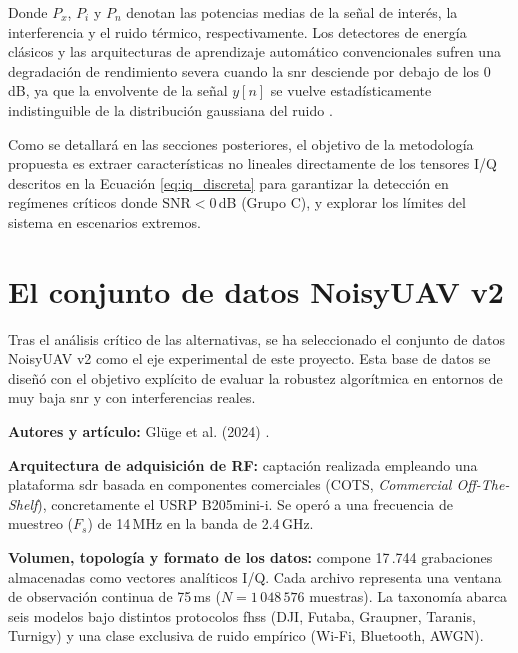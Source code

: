 Donde $P_x$, $P_i$ y $P_n$ denotan las potencias medias de la señal de interés, la interferencia y el ruido térmico, respectivamente. Los detectores de energía clásicos y las arquitecturas de aprendizaje automático convencionales sufren una degradación de rendimiento severa cuando la \gls{snr} desciende por debajo de los 0\,dB, ya que la envolvente de la señal $y[n]$ se vuelve estadísticamente indistinguible de la distribución gaussiana del ruido \cite{lacy_machine_2024}.

Como se detallará en las secciones posteriores, el objetivo de la metodología propuesta es extraer características no lineales directamente de los tensores I/Q descritos en la Ecuación \ref{eq:iq_discreta} para garantizar la detección en regímenes críticos donde $\text{SNR} < 0$\,dB (Grupo C), y explorar los límites del sistema en escenarios extremos.

\section{El conjunto de datos NoisyUAV v2}
\label{sec:dataset_noisyuav}

Tras el análisis crítico de las alternativas, se ha seleccionado el conjunto de datos NoisyUAV v2 como el eje experimental de este proyecto. Esta base de datos se diseñó con el objetivo explícito de evaluar la robustez algorítmica en entornos de muy baja \gls{snr} y con interferencias reales.

\textbf{Autores y artículo:} Glüge et al. (2024) \cite{gluge_robust_2024}.

\textbf{Arquitectura de adquisición de RF:} captación realizada empleando una plataforma \gls{sdr} basada en componentes comerciales (COTS, \textit{Commercial Off-The-Shelf}), concretamente el USRP B205mini-i. Se operó a una frecuencia de muestreo ($F_s$) de 14\,MHz en la banda de 2.4\,GHz.

\textbf{Volumen, topología y formato de los datos:} compone 17\,.744 grabaciones almacenadas como vectores analíticos I/Q. Cada archivo representa una ventana de observación continua de 75\,ms ($N = 1\,048\,576$ muestras). La taxonomía abarca seis modelos bajo distintos protocolos \gls{fhss} (DJI, Futaba, Graupner, Taranis, Turnigy) y una clase exclusiva de ruido empírico (Wi-Fi, Bluetooth, AWGN).

